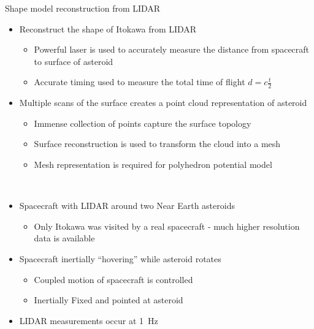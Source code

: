 \documentclass[final, usenames, dvipsnames]{beamer}
\newlength{\twocolwidth}
\begin{document}
\begin{frame}[t]
\begin{columns}[T,onlytextwidth]
\begin{column}{\twocolwidth}
\begin{block}{Shape model reconstruction from LIDAR} %
    \begin{minipage}[t]{0.5\columnwidth}
    \begin{itemize}
        \item Reconstruct the shape of Itokawa from LIDAR
            \begin{itemize}
                \item Powerful laser is used to accurately measure the distance from spacecraft to surface of asteroid
                \item Accurate timing used to measure the total time of flight \( d = c \frac{t}{2} \)
            \end{itemize}
        \item Multiple scans of the surface creates a point cloud representation of asteroid
        \begin{itemize}
            \item Immense collection of points capture the surface topology
            \item Surface reconstruction is used to transform the cloud into a mesh 
            \item Mesh representation is required for polyhedron potential model
        \end{itemize}
    \end{itemize}
    \end{minipage}~
    \begin{minipage}[t]{0.48\columnwidth}
    \begin{itemize}
        \item Spacecraft with LIDAR around two Near Earth asteroids
            \begin{itemize}
                \item Only Itokawa was visited by a real spacecraft - much higher resolution data is available
            \end{itemize}
        \item Spacecraft inertially ``hovering'' while asteroid rotates 
            \begin{itemize}
                \item Coupled motion of spacecraft is controlled 
                \item Inertially Fixed and pointed at asteroid
            \end{itemize}
        \item LIDAR measurements occur at \SI{1}{\hertz} 

\end{itemize}
\end{minipage}
\end{block}
\end{column}
\end{columns}
\end{frame}
\end{document}
